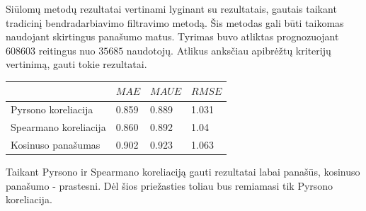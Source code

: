 \documentclass{VUMIFInfMagistrinis}
\begin{document}

\indent
Siūlomų metodų rezultatai vertinami lyginant su rezultatais, gautais taikant tradicinį bendradarbiavimo filtravimo metodą. Šis metodas gali būti taikomas naudojant skirtingus panašumo matus. Tyrimas buvo atliktas prognozuojant $608603$ reitingus nuo $35685$ naudotojų. Atlikus anksčiau apibrėžtų kriterijų vertinimą, gauti tokie rezultatai.
\begin{center}
	\begin{tabular}{ | l | l | l | l |}
		\hline
		& $MAE$ & $MAUE$ & $RMSE$ \\ \hline
		Pyrsono koreliacija   & 0.859 & 0.889 & 1.031 \\ \hline
		Spearmano koreliacija & 0.860 & 0.892 & 1.04  \\ \hline
		Kosinuso panašumas    & 0.902 & 0.923 & 1.063  \\ \hline
		\hline
	\end{tabular}
\end{center}
Taikant Pyrsono ir Spearmano koreliaciją gauti rezultatai labai panašūs, kosinuso panašumo - prastesni. Dėl šios priežasties toliau bus remiamasi tik Pyrsono koreliacija.
\end{document}
